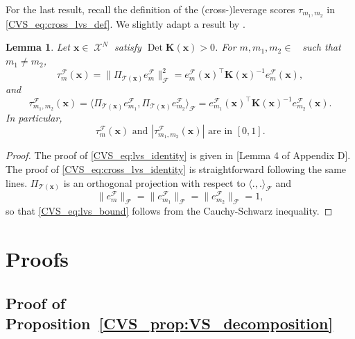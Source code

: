 \documentclass[twoside,11pt]{book}
\newtheorem{lemma}{Lemma}
\numberwithin{theorem}{chapter}
\numberwithin{definition}{chapter}
\numberwithin{proposition}{chapter}
\numberwithin{corollary}{chapter}
\numberwithin{example}{chapter}
\numberwithin{lemma}{chapter}
\numberwithin{assumption}{chapter}
\numberwithin{equation}{chapter}
\numberwithin{figure}{chapter}
\DeclareMathOperator{\Det}{Det}
\DeclareMathOperator{\Tran}{\intercal}
\DeclareMathOperator{\F}{\mathcal{F}}
\DeclareMathOperator{\X}{\mathcal{X}}
\DeclareMathOperator{\Ns}{\mathbb{N}^{*}}
\newcommand{\rb}[1]{\textcolor{magenta}{#1}}
\begin{document}
For the last result, recall the definition of the (cross-)leverage scores $\tau_{m_{1},m_{2}}$ in \eqref{CVS_eq:cross_lvs_def}. We slightly adapt a result by \cite{BeBaCh19} .
\begin{lemma}\label{CVS_lemma:lvs_identities}
Let $\bm{x} \in \X^{N}$ satisfy $\Det \bm{K}(\bm{x}) > 0$. For $m, m_{1}, m_{2} \in \Ns$ such that $m_{1} \neq m_{2}$,
\begin{equation}\label{CVS_eq:lvs_identity}
\tau_{m}^{\F}(\bm{x}) = \|\Pi_{\mathcal{T}(\bm{x})}e_{m}^{\F}\|_{\F}^{2} = e_{m}^{\F}(\bm{x})^{\Tran} \bm{K}(\bm{x})^{-1} e_{m}^{\F}(\bm{x}),
\end{equation}
and
\begin{equation}\label{CVS_eq:cross_lvs_identity}
\tau_{m_{1},m_{2}}^{\F}(\bm{x}) = \langle \Pi_{\mathcal{T}(\bm{x})}e_{m_{1}}^{\F}, \Pi_{\mathcal{T}(\bm{x})}e_{m_{2}}^{\F} \rangle_{\F} = e_{m_1}^{\F}(\bm{x})^{\Tran} \bm{K}(\bm{x})^{-1} e_{m_2}^{\F}(\bm{x}).
\end{equation}
In particular,
\begin{equation}
  \label{CVS_eq:lvs_bound}
  \tau_{m}^{\F}(\bm{x})\text{  and  }|\tau_{m_{1},m_{2}}^{\F}(\bm{x})|\text{  are in  }[0,1].
\end{equation}
\end{lemma}
\begin{proof}
The proof of \eqref{CVS_eq:lvs_identity} is given in \citep{BeBaCh19}[Lemma 4 of Appendix D]. The proof of \eqref{CVS_eq:cross_lvs_identity} is straightforward following the same lines. $\Pi_{\mathcal{T}(\bm{x})}$ is an orthogonal projection with respect to $\langle .,. \rangle_{\F}$ and
\begin{equation}
\|e_{m}^{\F}\|_{\F} = \|e_{m_{1}}^{\F}\|_{\F} = \|e_{m_{2}}^{\F}\|_{\F} = 1,
\end{equation}
so that \eqref{CVS_eq:lvs_bound} follows from the Cauchy-Schwarz inequality.
\end{proof}

\section{Proofs}
 \subsection{Proof of Proposition~\ref{CVS_prop:VS_decomposition}}\label{CVS_sec:proof_VS_decomposition}
\end{document}
